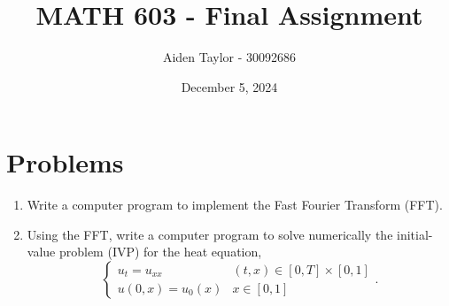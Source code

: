 \documentclass[11pt]{article}
\title{MATH 603 - Final Assignment}
\author{Aiden Taylor - 30092686}
\date{December 5, 2024}
\begin{document}
\maketitle \newpage \tableofcontents
\newpage
\section{Problems}
	\begin{enumerate}[1.]
		\item Write a computer program to implement the Fast Fourier Transform (FFT).
	\item Using the FFT, write a computer program to solve numerically
		the initial-value problem (IVP) for the heat equation,
			\[
		\begin{cases}
			u_t = u_{xx} & (t,x) \in [0,T] \times [0,1] \\
			u(0,x) = u_0(x) & x \in [0,1]
		\end{cases}.
			\]
	\end{enumerate}
\newpage
\end{document}
